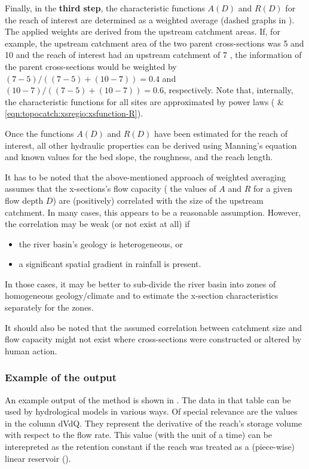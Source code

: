 Finally, in the \textbf{third step}, the characteristic functions $A(D)$ and $R(D)$ for the reach of interest are determined as a weighted average (dashed graphs in ). The applied weights are derived from the upstream catchment areas. If, for example, the upstream catchment area of the two parent cross-sections was 5 and 10 \sqkm{} and the reach of interest had an upstream catchment of 7 \sqkm{}, the information of the parent cross-sections would be weighted by $(7-5)/((7-5)+(10-7)) = 0.4$ and $(10-7)/((7-5)+(10-7)) = 0.6$, respectively. Note that, internally, the characteristic functions for all sites are approximated by power laws ( \& \ref{eqn:topocatch:xsregio:xsfunction-R}).

Once the functions $A(D)$ and $R(D)$ have been estimated for the reach of interest, all other hydraulic properties can be derived using Manning's equation and known values for the bed slope, the roughness, and the reach length.

It has to be noted that the above-mentioned approach of weighted averaging assumes that the x-sections's flow capacity (\ie{} the values of $A$ and $R$ for a given flow depth $D$) are (positively) correlated with the size of the upstream catchment. In many cases, this appears to be a reasonable assumption. However, the correlation may be weak (or not exist at all) if
\begin{itemize}
  \item the river basin's geology is heterogeneous, or
  \item a significant spatial gradient in rainfall is present.
\end{itemize}

In those cases, it may be better to sub-divide the river basin into zones of homogeneous geology/climate and to estimate the x-section characteristics separately for the zones.

It should also be noted that the assumed correlation between catchment size and flow capacity might not exist where cross-sections were constructed or altered by human action.

\subsubsection*{Example of the output}
An example output of the  method is shown in . The data in that table can be used by hydrological models in various ways. Of special relevance are the values in the column dVdQ. They represent the derivative of the reach's storage volume with respect to the flow rate. This value (with the unit of a time) can be interepreted as the retention constant if the reach was treated as a (piece-wise) linear reservoir ().

